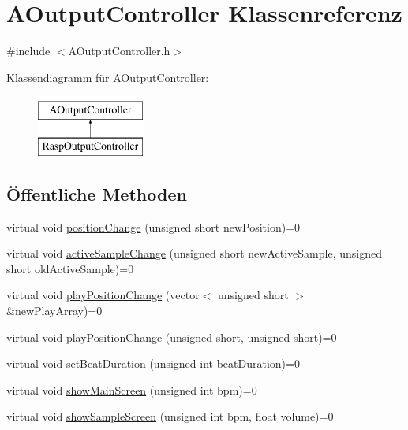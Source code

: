 \hypertarget{class_a_output_controller}{}\section{A\+Output\+Controller Klassenreferenz}
\label{class_a_output_controller}


{\ttfamily \#include $<$A\+Output\+Controller.\+h$>$}

Klassendiagramm für A\+Output\+Controller\+:\begin{figure}[H]
\begin{center}
\leavevmode
\includegraphics[height=2.000000cm]{class_a_output_controller}
\end{center}
\end{figure}
\subsection*{Öffentliche Methoden}
\begin{DoxyCompactItemize}
\item 
virtual void \hyperlink{class_a_output_controller_a5a818a40e2911411d378032b8b2fb6c8}{position\+Change} (unsigned short new\+Position)=0
\item 
virtual void \hyperlink{class_a_output_controller_ac2b87aa6291c38cc65185bf6a37ae300}{active\+Sample\+Change} (unsigned short new\+Active\+Sample, unsigned short old\+Active\+Sample)=0
\item 
virtual void \hyperlink{class_a_output_controller_a7bad658dfc3eb1223ace0c0454130818}{play\+Position\+Change} (vector$<$ unsigned short $>$ \&new\+Play\+Array)=0
\item 
virtual void \hyperlink{class_a_output_controller_a15c1300df5606bf7d4838b41a45c31e3}{play\+Position\+Change} (unsigned short, unsigned short)=0
\item 
virtual void \hyperlink{class_a_output_controller_ac685432fc57d2441ecb548386554d2c9}{set\+Beat\+Duration} (unsigned int beat\+Duration)=0
\item 
virtual void \hyperlink{class_a_output_controller_ace7df9de71110b3615156b9bd06a9349}{show\+Main\+Screen} (unsigned int bpm)=0
\item 
virtual void \hyperlink{class_a_output_controller_aab53d12a6aa6f38d0e4ead69e85ed4fe}{show\+Sample\+Screen} (unsigned int bpm, float volume)=0
\end{DoxyCompactItemize}


